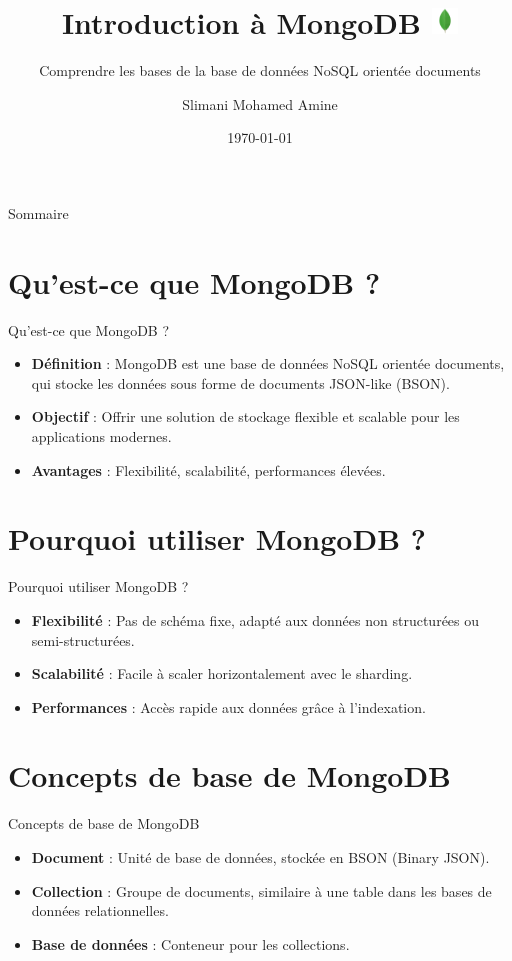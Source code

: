 \documentclass{clbeamer2024}
\title{
        Introduction à MongoDB
	\includegraphics[width=0.7cm]{logos/MongoDB.png} \hfill
}
\subtitle{Comprendre les bases de la base de données NoSQL orientée documents}
\author{Slimani Mohamed Amine}
\institute{EHTP}
\date{\today}
\begin{document}
	\setcounter{framenumber}{-1}
	\frame{\titlepage}
	
	
	
	\begin{frame}{Sommaire}
		\tableofcontents
	\end{frame}
	
	
	\section{Qu'est-ce que MongoDB ?}
	\begin{frame}{Qu'est-ce que MongoDB ?}
		\begin{itemize}
			\item \textbf{Définition} : MongoDB est une base de données NoSQL orientée documents, qui stocke les données sous forme de documents JSON-like (BSON).
			\item \textbf{Objectif} : Offrir une solution de stockage flexible et scalable pour les applications modernes.
			\item \textbf{Avantages} : Flexibilité, scalabilité, performances élevées.
		\end{itemize}
	\end{frame}
	
	
	\section{Pourquoi utiliser MongoDB ?}
	\begin{frame}{Pourquoi utiliser MongoDB ?}
		\begin{itemize}
			\item \textbf{Flexibilité} : Pas de schéma fixe, adapté aux données non structurées ou semi-structurées.
			\item \textbf{Scalabilité} : Facile à scaler horizontalement avec le sharding.
			\item \textbf{Performances} : Accès rapide aux données grâce à l'indexation.
		\end{itemize}
	\end{frame}
	
	
	\section{Concepts de base de MongoDB}
	\begin{frame}{Concepts de base de MongoDB}
		\begin{itemize}
			\item \textbf{Document} : Unité de base de données, stockée en BSON (Binary JSON).
			\item \textbf{Collection} : Groupe de documents, similaire à une table dans les bases de données relationnelles.
			\item \textbf{Base de données} : Conteneur pour les collections.
		\end{itemize}
	\end{frame}	
	
\end{document}
